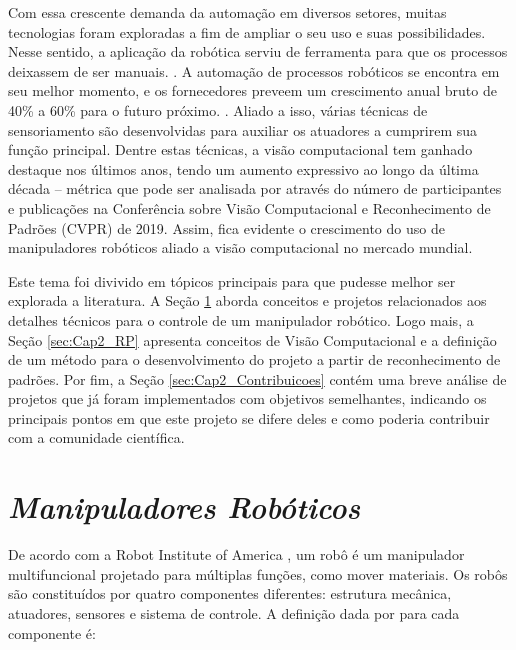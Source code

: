 Com essa crescente demanda da automação em diversos setores, muitas tecnologias foram exploradas a fim de ampliar o seu uso e suas possibilidades. Nesse sentido, a aplicação da robótica serviu de ferramenta para que os processos deixassem de ser manuais. \cite{bastos2014aplicaccao}. A automação de processos robóticos se encontra em seu melhor momento, e os fornecedores preveem um crescimento anual bruto de 40\% a 60\% para o futuro próximo. \cite{saukkonen2020robotic}. Aliado a isso, várias técnicas de sensoriamento são desenvolvidas para auxiliar os atuadores a cumprirem sua função principal. Dentre estas técnicas, a visão computacional tem ganhado destaque nos últimos anos, tendo um aumento expressivo ao longo da última década – métrica que pode ser analisada por \cite{su2021affective} através do número de participantes e publicações na Conferência sobre Visão Computacional e Reconhecimento de Padrões (CVPR) de 2019. Assim, fica evidente o crescimento do uso de manipuladores robóticos aliado a visão computacional no mercado mundial.

Este tema foi divivido em tópicos principais para que pudesse melhor ser explorada a literatura. A Seção \ref{sec:Cap2_MR} aborda conceitos e projetos relacionados aos detalhes técnicos para o controle de um manipulador robótico. Logo mais, a Seção \ref{sec:Cap2_RP} apresenta conceitos de Visão Computacional e a definição de um método para o desenvolvimento do projeto a partir de reconhecimento de padrões. Por fim, a Seção \ref{sec:Cap2_Contribuicoes} contém uma breve análise de projetos que já foram implementados com objetivos semelhantes, indicando os principais pontos em que este projeto se difere deles e como poderia contribuir com a comunidade científica.


\section{\textit{Manipuladores Robóticos}}\label{sec:Cap2_MR}

De acordo com a Robot Institute of America \cite{baturone2005robotica}, um robô é um manipulador multifuncional projetado para múltiplas funções, como mover materiais. Os robôs são constituídos por quatro componentes diferentes: estrutura mecânica, atuadores, sensores e sistema de controle. A definição dada por \cite{siciliano2010robotics} para cada componente é:

